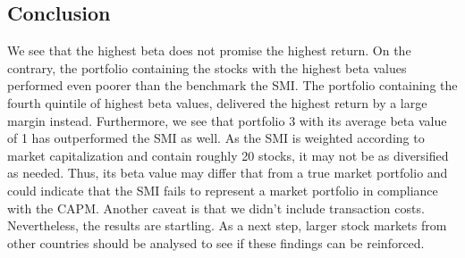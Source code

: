 \documentclass[12pt,a4paper]{article}
\begin{document}
\begin{justify}
\section{Conclusion}
We see that the highest beta does not promise the highest return. On the contrary, the portfolio containing the stocks with the highest beta values performed even poorer than the benchmark the SMI. The portfolio containing the fourth quintile of highest beta values, delivered the highest return by a large margin instead. Furthermore, we see that portfolio 3 with its average beta value of 1 has outperformed the SMI as well. As the SMI is weighted according to market capitalization and contain roughly 20 stocks, it may not be as diversified as needed. Thus, its beta value may differ that from a true market portfolio and could indicate that the SMI fails to represent a market portfolio in compliance with the CAPM. Another caveat is that we didn't include transaction costs. Nevertheless, the results are startling. As a next step, larger stock markets from other countries should be analysed to see if these findings can be reinforced.



\newpage



\end{justify}
\end{document}
